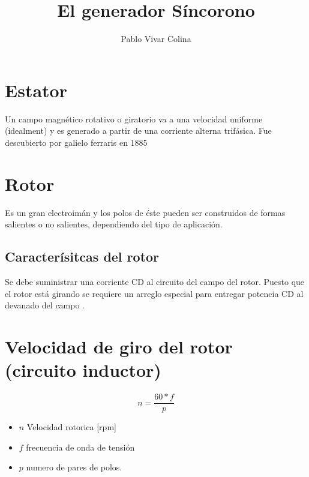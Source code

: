 \documentclass[]{article}
\title{El generador Síncorono}
\author{Pablo Vivar Colina}
\begin{document}
	

\maketitle





\section{Estator}

Un campo magnético rotativo o giratorio va a una velocidad uniforme (idealment) y es generado a partir de una corriente alterna trifásica. Fue descubierto por galielo ferraris en 1885

\section{Rotor}

Es un gran electroimán y los polos de éste pueden ser construidos de formas salientes o no salientes, dependiendo del tipo de aplicación.\\

\subsection{Caracterísitcas del rotor}

Se debe suministrar una corriente CD al circuito del campo del rotor. Puesto que el rotor está girando se requiere un arreglo especial para entregar potencia CD al devanado del campo .\\

\section{Velocidad de giro del rotor (circuito inductor)}

\begin{equation}
 n=\frac{60*f}{p}
\end{equation}


\begin{itemize}
	\item $n$ Velocidad rotorica [rpm]
	\item $f$ frecuencia de onda de tensión
	\item $p$ numero de pares de polos.
\end{itemize}
\end{document}
